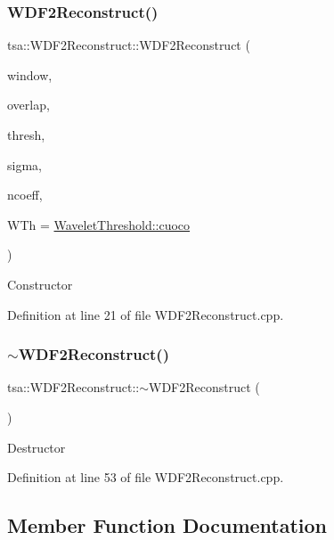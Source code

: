 \subsubsection{\texorpdfstring{W\+D\+F2\+Reconstruct()}{WDF2Reconstruct()}}
{\footnotesize\ttfamily tsa\+::\+W\+D\+F2\+Reconstruct\+::\+W\+D\+F2\+Reconstruct (\begin{DoxyParamCaption}\item[{unsigned int}]{window,  }\item[{unsigned int}]{overlap,  }\item[{double}]{thresh,  }\item[{double}]{sigma,  }\item[{unsigned int}]{ncoeff,  }\item[{enum \hyperlink{classtsa_1_1_wavelet_threshold_a50c42c95dae960986a985157ca038fae}{Wavelet\+Threshold\+::\+Wavelet\+Thresholding}}]{W\+Th = {\ttfamily \hyperlink{classtsa_1_1_wavelet_threshold_a50c42c95dae960986a985157ca038faea849b2c33799f9de0e842f1d935ea3822}{Wavelet\+Threshold\+::cuoco}} }\end{DoxyParamCaption})}

Constructor 

Definition at line 21 of file W\+D\+F2\+Reconstruct.\+cpp.

\mbox{\label{classtsa_1_1_w_d_f2_reconstruct_a0f5a941f09423254ceaff5d60365d894}} 
\subsubsection{\texorpdfstring{$\sim$\+W\+D\+F2\+Reconstruct()}{~WDF2Reconstruct()}}
{\footnotesize\ttfamily tsa\+::\+W\+D\+F2\+Reconstruct\+::$\sim$\+W\+D\+F2\+Reconstruct (\begin{DoxyParamCaption}{ }\end{DoxyParamCaption})}

Destructor 

Definition at line 53 of file W\+D\+F2\+Reconstruct.\+cpp.



\subsection{Member Function Documentation}
\mbox{\label{classtsa_1_1_w_d_f2_reconstruct_a39d74ac7135a6daa66bd7c2880f33215}} 
